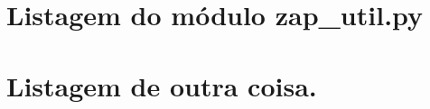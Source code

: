 \appendix

\chapter{Listagem do módulo zap\_util.py}\label{ap:listagem_zap_util}




\chapter{Listagem de outra coisa.}